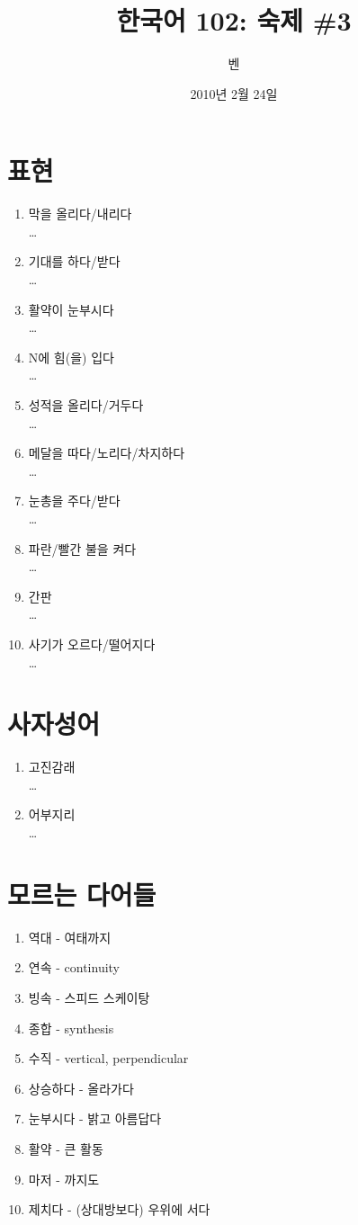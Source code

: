 \documentclass[11pt]{article}
\title{한국어 102: 숙제 \#3}
\author{벤}
\date{2010년 2월 24일}
\begin{document}
\maketitle
\thispagestyle{empty}
\pagestyle{empty}

\section{표현}
\begin{enumerate}
  \item 막을 올리다/내리다 \\
    \ldots
  \item 기대를 하다/받다 \\
    \ldots
  \item 활약이 눈부시다 \\
    \ldots
  \item N에 힘(을) 입다 \\
    \ldots
  \item 성적을 올리다/거두다 \\
    \ldots
  \item 메달을 따다/노리다/차지하다 \\
    \ldots
  \item 눈총을 주다/받다 \\
    \ldots
  \item 파란/빨간 불을 켜다 \\
    \ldots
  \item 간판 \\
    \ldots
  \item 사기가 오르다/떨어지다 \\
    \ldots
\end{enumerate}

\section{사자성어}
\begin{enumerate}
  \item 고진감래 \\
    \ldots
  \item 어부지리 \\
    \ldots
\end{enumerate}

\section{모르는 다어들}
\begin{enumerate}
  \item 역대 - 여태까지
  \item 연속 - continuity
  \item 빙속 - 스피드 스케이탕
  \item 종합 - synthesis
  \item 수직 - vertical, perpendicular
  \item 상승하다 - 올라가다
  \item 눈부시다 - 밝고 아름답다
  \item 활약 - 큰 활동
  \item 마저 - 까지도
  \item 제치다 - (상대방보다) 우위에 서다 
\end{enumerate}
\end{document}
